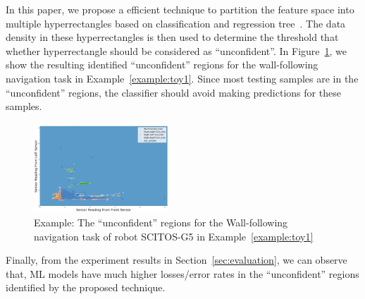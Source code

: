 In this paper, we propose a efficient technique to partition the feature space into multiple hyperrectangles based on classification and regression tree~\cite{Breiman:2253780}.  The data density in these hyperrectangles is then used to determine the threshold that whether hyperrectangle should be considered as ``unconfident''.  In Figure~\ref{fig:toy2},  we show the resulting identified  ``unconfident'' regions  for  the wall-following navigation task  in Example~\ref{example:toy1}. Since most testing samples are in the ``unconfident'' regions, the classifier should avoid making predictions for these samples.
\begin{figure}[t]
\centering
\includegraphics[width=0.45\textwidth]{FIG/toy2.png}
\caption{ Example: The ``unconfident'' regions for the Wall-following navigation task of robot SCITOS-G5 in Example~\ref{example:toy1}}
\label{fig:toy2}
\end{figure}
Finally, from the experiment results in Section~\ref{sec:evaluation}, we can observe that,  ML models have much higher losses/error rates in the  ``unconfident'' regions identified by the proposed technique.









